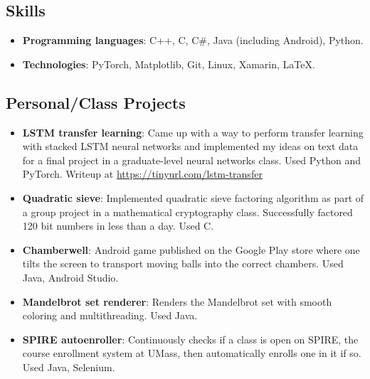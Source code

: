\documentclass{article}
\begin{document}
	\subsection*{Skills}
		\begin{itemize}[noitemsep,leftmargin=40pt]
			\item \textbf{Programming languages}: C++, C, C\#, Java (including Android), Python.
			\item \textbf{Technologies}: PyTorch, Matplotlib, Git, Linux, Xamarin, \LaTeX.
		\end{itemize}
	\subsection*{Personal/Class Projects}
    	\begin{itemize}[noitemsep,leftmargin=40pt]
    		\item \textbf{LSTM transfer learning}: Came up with a way to perform transfer learning with stacked LSTM neural networks and implemented my ideas on text data for a final project in a graduate-level neural networks class. Used Python and PyTorch. Writeup at \href{https://tinyurl.com/lstm-transfer}{https://tinyurl.com/lstm-transfer}
        	\item \textbf{Quadratic sieve}: Implemented quadratic sieve factoring algorithm as part of a group project in a mathematical cryptography class. Successfully factored 120 bit numbers in less than a day. Used C.
            \item \textbf{Chamberwell}: Android game published on the Google Play store where one tilts the screen to transport moving balls into the correct chambers. Used Java, Android Studio.
			\item \textbf{Mandelbrot set renderer}: Renders the Mandelbrot set with smooth coloring and multithreading. Used Java.
            \item \textbf{SPIRE autoenroller}: Continuously checks if a class is open on SPIRE, the course enrollment system at UMass, then automatically enrolls one in it if so. Used Java, Selenium.
        \end{itemize}
\end{document}
